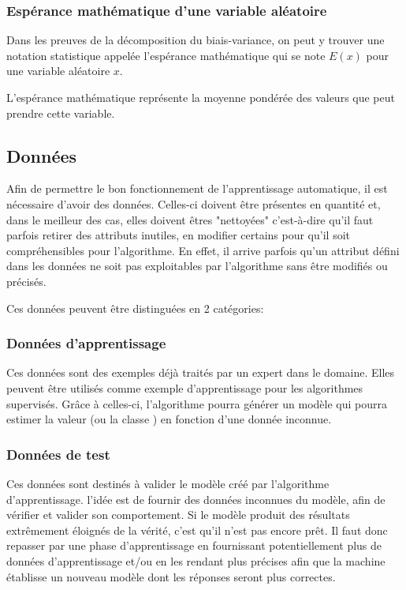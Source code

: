 \documentclass[a4paper]{article}
\begin{document}
\subsubsection{Espérance mathématique d'une variable aléatoire}
Dans les preuves de la décomposition du biais-variance, on peut y trouver une notation statistique appelée l'espérance mathématique qui se note $ E(x) $ pour une variable aléatoire $x$. \newline

L'espérance mathématique représente la moyenne pondérée des valeurs que peut prendre cette variable. 

\newpage

\subsection{Données}
\label{Data}
Afin de permettre le bon fonctionnement de l'apprentissage automatique, il est nécessaire d'avoir des données. Celles-ci doivent être présentes en quantité et, dans le meilleur des cas, elles doivent êtres "nettoyées" c'est-à-dire qu'il faut parfois retirer des attributs inutiles, en modifier certains pour qu'il soit compréhensibles pour l'algorithme. En effet, il arrive parfois qu'un attribut défini dans les données ne soit pas exploitables par l'algorithme sans être modifiés ou précisés. \newline

Ces données peuvent être distinguées en 2 catégories:

\subsubsection{Données d'apprentissage}
Ces données sont des exemples déjà traités par un expert dans le domaine. Elles peuvent être utilisés comme exemple d'apprentissage pour les algorithmes supervisés. Grâce à celles-ci, l'algorithme pourra générer un modèle qui pourra estimer la valeur (ou la classe ) en fonction d'une donnée inconnue.

\subsubsection{Données de test}
Ces données sont destinés à valider le modèle créé par l'algorithme d'apprentissage. l'idée est de fournir des données inconnues du modèle, afin de vérifier et valider son comportement. Si le modèle produit des résultats extrêmement éloignés de la vérité, c'est qu'il n'est pas encore prêt. Il faut donc repasser par une phase d'apprentissage en fournissant potentiellement plus de données d'apprentissage et/ou en les rendant plus précises afin que la machine établisse un nouveau modèle dont les réponses seront plus correctes.
\end{document}
